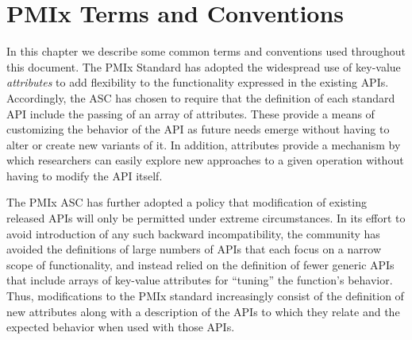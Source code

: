 \chapter{PMIx Terms and Conventions}
\label{chap:terms}

In this chapter we describe some common terms and conventions used throughout this document.
The \ac{PMIx} Standard has adopted the widespread use of key-value \textit{attributes} to add flexibility to the functionality expressed in the existing \acp{API}. Accordingly, the \ac{ASC} has chosen to require that the definition of each standard \ac{API} include the passing of an array of attributes. These provide a means of customizing the behavior of the \ac{API} as future needs emerge without having to alter or create new variants of it. In addition, attributes provide a mechanism by which researchers can easily explore new approaches to a given operation without having to modify the \ac{API} itself.

The \ac{PMIx} \ac{ASC} has further adopted a policy that modification of existing released \acp{API} will only be permitted under extreme circumstances. In its effort to avoid introduction of any such backward incompatibility, the community has avoided the definitions of large numbers of \acp{API} that each focus on a narrow scope of functionality, and instead relied on the definition of fewer generic \acp{API} that include arrays of key-value attributes for ``tuning'' the function's behavior. Thus, modifications to the PMIx standard increasingly consist of the definition of new attributes along with a description of the \acp{API} to which they relate and the expected behavior when used with those \acp{API}.

